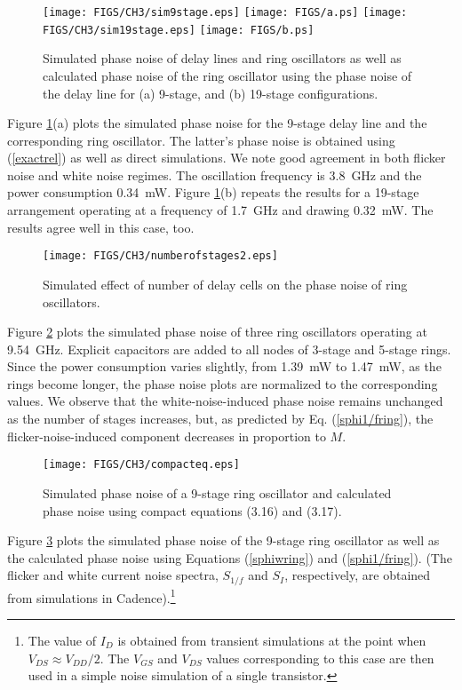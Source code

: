 \begin{figure}[htb!]
\centering
\texttt{[image: FIGS/CH3/sim9stage.eps]}
\texttt{[image: FIGS/a.ps]}
\texttt{[image: FIGS/CH3/sim19stage.eps]}
\texttt{[image: FIGS/b.ps]}
\caption{Simulated phase noise of delay lines and ring oscillators as well as calculated phase noise of the ring oscillator using the phase noise of the delay line for (a)
9-stage, and (b) 19-stage configurations.}
\label{fig:sim}
\end{figure}
Figure \ref{fig:sim}(a) plots the simulated phase noise for the 9-stage delay line and the corresponding ring oscillator.
The latter's phase noise is obtained using
(\ref{exactrel}) as well as direct simulations. We note good agreement in both flicker noise and white noise regimes. The oscillation frequency is 3.8~GHz and the power
consumption 0.34~mW. Figure \ref{fig:sim}(b) repeats the results for a 19-stage arrangement operating at a frequency of 1.7~GHz and drawing 0.32~mW. The results agree well
in this case, too.

\begin{figure}[htb!]
\centering
\texttt{[image: FIGS/CH3/numberofstages2.eps]}
\caption{Simulated effect of number of delay cells on the phase noise of ring oscillators.}
\label{fig:numberofstages}
\end{figure}
Figure \ref{fig:numberofstages} plots the simulated phase noise of three ring oscillators operating at 9.54~GHz. Explicit capacitors are added to all nodes of 3-stage and
5-stage rings.
Since the power consumption varies slightly, from 1.39~mW to 1.47~mW, as the rings become longer, the phase noise plots
are normalized to the corresponding values. We observe that the white-noise-induced phase noise remains unchanged as the number of stages increases, but, as predicted by 
Eq. (\ref{sphi1/fring}), the flicker-noise-induced component decreases in proportion to $M$. 


\begin{figure}[htb!]
\centering
\texttt{[image: FIGS/CH3/compacteq.eps]}
\caption{Simulated phase noise of a 9-stage ring oscillator and calculated phase noise using compact equations (3.16) and (3.17).}
\label{fig:compacteq}
\end{figure}
Figure \ref{fig:compacteq} plots the simulated phase noise of the 9-stage ring oscillator as well as the calculated phase noise using
Equations (\ref{sphiwring}) and (\ref{sphi1/fring}). 
(The flicker and white current noise spectra, $S_{1/f}$ and $S_I$, respectively, are obtained from simulations in Cadence).\footnote{The value of $I_D$ is
obtained from transient simulations at the point when $V_{DS}\approx V_{DD}/2$. The $V_{GS}$ and $V_{DS}$ values corresponding to this case are then used in a simple noise
simulation of a single transistor.}




